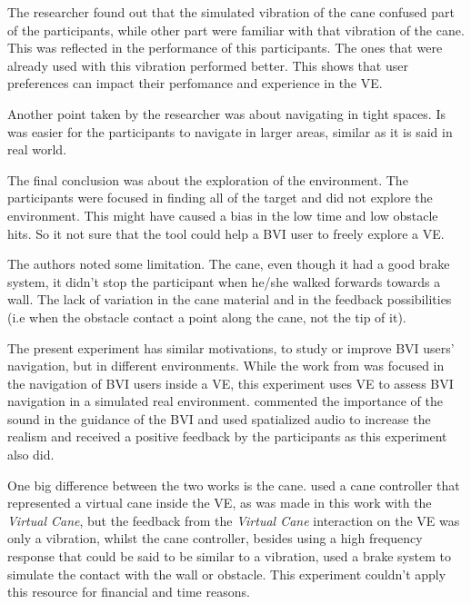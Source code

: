 The researcher found out that the simulated vibration of the cane confused part of the participants, while other part were familiar with that vibration of the cane. This was reflected in the performance of this participants. The ones that were already used with this vibration performed better. This shows that user preferences can impact their perfomance and experience in the VE. 

Another point taken by the researcher was about navigating in tight spaces. Is was easier for the participants to navigate in larger areas, similar as it is said in real world. 

The final conclusion was about the exploration of the environment. The participants were focused in finding all of the target and did not explore the environment. This might have caused a bias in the low time and low obstacle hits. So it not sure that the tool could help a BVI user to freely explore a VE.

The authors noted some limitation. The cane, even though it had a good brake system, it didn't stop the participant when he/she walked forwards towards a wall. The lack of variation in the cane material and in the feedback possibilities (i.e when the obstacle contact a point along the cane, not the tip of it).

The present experiment has similar motivations, to study or improve BVI users' navigation, but in different environments. While the work from \citeauthor{siu2020virtual} was focused in the navigation of BVI users inside a VE, this experiment uses VE to assess BVI navigation in a simulated real environment. \citeauthor{siu2020virtual} commented the importance of the sound in the guidance of the BVI and used spatialized audio to increase the realism and received a positive feedback by the participants as this experiment also did.

One big difference between the two works is the cane. \citeauthor{siu2020virtual} used a cane controller that represented a virtual cane inside the VE, as was made in this work with the \textit{Virtual Cane}, but the feedback from the \textit{Virtual Cane} interaction on the VE was only a vibration, whilst the cane controller, besides using a high frequency response that could be said to be similar to a vibration,  used a brake system to simulate the contact with the wall or obstacle. This experiment couldn't apply this resource for financial and time reasons.